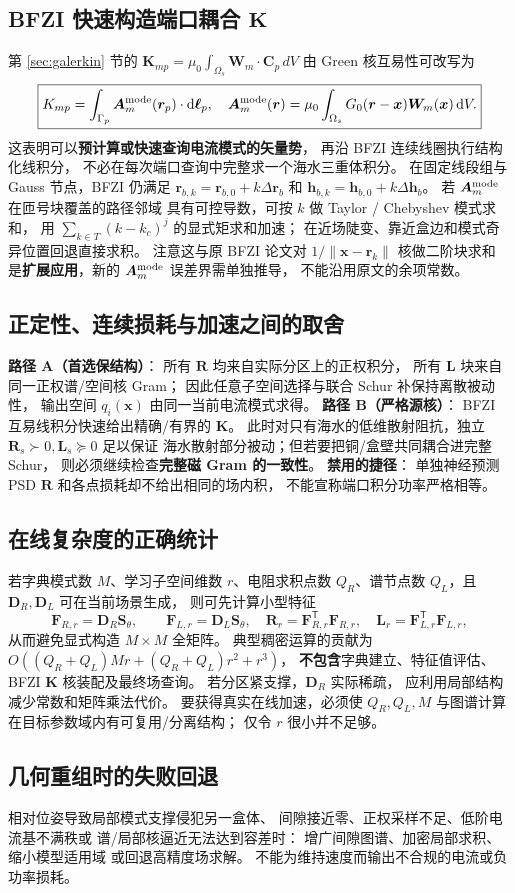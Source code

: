 \subsection{BFZI 快速构造端口耦合 \(\bm K\)}
第 \ref{sec:galerkin} 节的
\(\bm K_{mp}=\mu_0\int_{\Omega_s}\bm W_m\cdot\bm C_p\,dV\)
由 Green 核互易性可改写为
\begin{equation}
\boxed{
K_{mp}=\int_{\Gamma_p}\bm A_m^{\rm mode}(\bm r_p)
\cdot \mathrm d\bm\ell_p,\quad
\bm A_m^{\rm mode}(\bm r)
=\mu_0\int_{\Omega_s}G_0(\bm r-\bm x)\bm W_m(\bm x)\,\mathrm dV.
}
\label{eq:K-reciprocal}
\end{equation}
这表明可以\textbf{预计算或快速查询电流模式的矢量势}，
再沿 BFZI 连续线圈执行结构化线积分，
不必在每次端口查询中完整求一个海水三重体积分。
在固定线段组与 Gauss 节点，BFZI 仍满足
\(\bm r_{b,k}=\bm r_{b,0}+k\Delta\bm r_b\) 和
\(\bm h_{b,k}=\bm h_{b,0}+k\Delta\bm h_b\)。
若 \(\bm A_m^{\rm mode}\) 在匝号块覆盖的路径邻域
具有可控导数，可按 \(k\) 做 Taylor / Chebyshev 模式求和，
用
\(\sum_{k\in T}(k-k_c)^j\) 的显式矩求和加速；
在近场陡变、靠近盒边和模式奇异位置回退直接求积。
注意这与原 BFZI 论文对 \(1/\|\bm x-\bm r_k\|\) 核做二阶块求和
是\textbf{扩展应用}，新的 \(\bm A_m^{\rm mode}\) 误差界需单独推导，
不能沿用原文的余项常数。

\subsection{正定性、连续损耗与加速之间的取舍}
\textbf{路径 A（首选保结构）}：
所有 \(\bm R\) 均来自实际分区上的正权积分，
所有 \(\bm L\) 块来自同一正权谱/空间核 Gram；
因此任意子空间选择与联合 Schur 补保持离散被动性，
输出空间 \(q_i(\bm x)\) 由同一当前电流模式求得。
\textbf{路径 B（严格源核）}：
BFZI 互易线积分快速给出精确/有界的 \(\bm K\)。
此时对只有海水的低维散射阻抗，独立
\(\bm R_s\succ0,\bm L_s\succeq0\) 足以保证
海水散射部分被动；但若要把铜/盒壁共同耦合进完整 Schur，
则必须继续检查\textbf{完整磁 Gram 的一致性}。
\textbf{禁用的捷径}：
单独神经预测 PSD \(\bm R\) 和各点损耗却不给出相同的场内积，
不能宣称端口积分功率严格相等。

\subsection{在线复杂度的正确统计}
若字典模式数 \(M\)、学习子空间维数 \(r\)、电阻求积点数
\(Q_R\)、谱节点数 \(Q_L\)，且
\(\bm D_R,\bm D_L\) 可在当前场景生成，
则可先计算小型特征
\[
\bm F_{R,r}=\bm D_R\bm S_\theta,\qquad
\bm F_{L,r}=\bm D_L\bm S_\theta,
\quad
\bm R_r=\bm F_{R,r}^{\mathsf T}\bm F_{R,r},\quad
\bm L_r=\bm F_{L,r}^{\mathsf T}\bm F_{L,r},
\]
从而避免显式构造 \(M\times M\) 全矩阵。
典型稠密运算的贡献为
\(O((Q_R+Q_L)Mr+(Q_R+Q_L)r^2+r^3)\)，
\textbf{不包含}字典建立、特征值评估、
BFZI \(\bm K\) 核装配及最终场查询。
若分区紧支撑，\(\bm D_R\) 实际稀疏，
应利用局部结构减少常数和矩阵乘法代价。
要获得真实在线加速，必须使
\(Q_R,Q_L,M\) 与图谱计算在目标参数域内有可复用/分离结构；
仅令 \(r\) 很小并不足够。

\subsection{几何重组时的失败回退}
相对位姿导致局部模式支撑侵犯另一盒体、
间隙接近零、正权采样不足、低阶电流基不满秩或
谱/局部核逼近无法达到容差时：
增广间隙图谱、加密局部求积、缩小模型适用域
或回退高精度场求解。
不能为维持速度而输出不合规的电流或负功率损耗。
